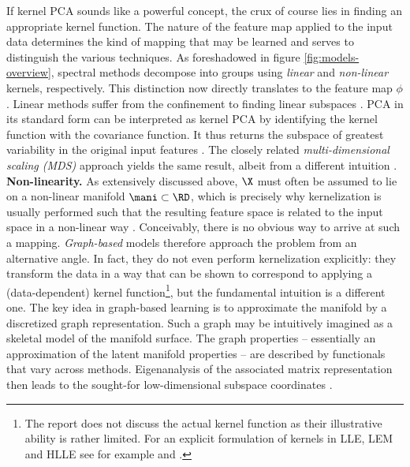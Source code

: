 If kernel PCA sounds like a powerful concept, the crux of course lies in 
finding an appropriate kernel function.
The nature of the feature map applied to the input data determines the kind of 
mapping that may be learned and serves to distinguish the various techniques.
As foreshadowed in figure \ref{fig:models-overview}, spectral methods decompose 
into groups using \textit{linear} and \textit{non-linear} kernels, respectively.
This distinction now directly translates to the feature map $\phi$.
Linear methods suffer from the confinement to finding linear subspaces \citep{vandermaatenetal2009}.
PCA in its standard form can be interpreted as kernel PCA by identifying the 
kernel function with the covariance function.
It thus returns the subspace of greatest variability in the original input 
features \citep{hametal2003}.
The closely related \textit{multi-dimensional scaling (MDS)} approach yields the 
same result, albeit from a different intuition \citep{sauletal2006}.
\\

\textbf{Non-linearity.} As extensively discussed above, $\X$ must often be 
assumed to lie on a non-linear manifold $\mani \subset \RD$, which is precisely 
why kernelization is usually performed such that the resulting feature space is 
related to the input space in a non-linear way \citep{schoelkopfetal1998}.
Conceivably, there is no obvious way to arrive at such a mapping.
\textit{Graph-based} models therefore approach the problem from an alternative 
angle.
In fact, they do not even perform kernelization explicitly: they transform the 
data in a way that can be shown to correspond to applying a (data-dependent) 
kernel function\footnote{
The report does not discuss the actual kernel function as their illustrative 
ability is rather limited.
For an explicit formulation of kernels in LLE, LEM and HLLE see for example \citet{bengioetal2004} and \citet{weinbergeretal2004}.
}, 
but the fundamental intuition is a different one. 
The key idea in graph-based learning is to approximate the manifold by a 
discretized graph representation.
Such a graph may be intuitively imagined as a skeletal model 
of the manifold surface.
The graph properties -- essentially an approximation of the latent manifold 
properties -- are described by functionals that vary across methods.
Eigenanalysis of the associated matrix representation then leads to the 
sought-for low-dimensional subspace coordinates \citep{sauletal2006}.
\\


